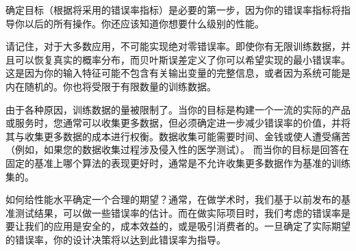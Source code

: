 确定目标（根据将采用的错误率指标）是必要的第一步，因为你的错误率指标将指导你以后的所有操作。你还应该知道你想要什么级别的性能。

请记住，对于大多数应用，不可能实现绝对零错误率。即使你有无限训练数据，并且可以恢复真实的概率分布，而贝叶斯误差定义了你可以希望实现的最小错误率。这是因为你的输入特征可能不包含有关输出变量的完整信息，或者因为系统可能是内在随机的。你也将受限于有限数量的训练数据。

由于各种原因，训练数据的量被限制了。当你的目标是构建一个一流的实际的产品或服务时，您通常可以收集更多数据，但必须确定进一步减少错误率的价值，并将其与收集更多数据的成本进行权衡。数据收集可能需要时间、金钱或使人遭受痛苦（例如，如果您的数据收集过程涉及侵入性的医学测试）。 而当你的目标是回答在固定的基准上哪个算法的表现更好时，通常是不允许收集更多数据作为基准的训练集的。

如何给性能水平确定一个合理的期望？通常，在做学术时，我们基于以前发布的基准测试结果，可以做一些错误率的估计。而在做实际项目时，我们考虑的错误率是要让我们的应用是安全的，成本效益的，或是吸引消费者的。一旦确定了实际期望的错误率，你的设计决策将以达到此错误率为指导。

